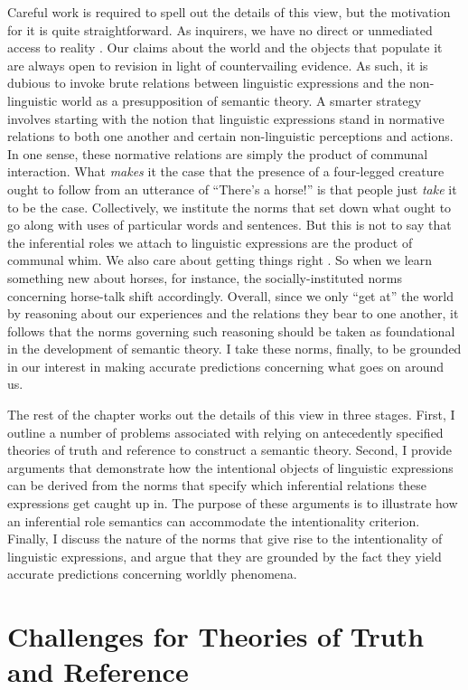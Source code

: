 Careful work is required to spell out the details of this view, but the motivation for it is quite straightforward. As inquirers, we have no direct or unmediated access to reality \citep{Misak:2013}. Our claims about the world and the objects that populate it are always open to revision in light of countervailing evidence. As such, it is dubious to invoke brute relations between linguistic expressions and the non-linguistic world as a presupposition of semantic theory. A smarter strategy involves starting with the notion that linguistic expressions stand in normative relations to both one another and certain non-linguistic perceptions and actions. In one sense, these normative relations are simply the product of communal interaction. What \textit{makes} it the case that the presence of a four-legged creature ought to follow from an utterance of  ``There's a horse!'' is that people just \textit{take} it to be the case. Collectively, we institute the norms that set down what ought to go along with uses of particular words and sentences. But this is not to say that the inferential roles we attach to linguistic expressions are the product of communal whim. We also care about getting things right \citep{Misak:2013}. So when we learn something new about horses, for instance, the socially-instituted norms concerning horse-talk shift accordingly. Overall, since we only ``get at'' the world by reasoning about our experiences and the relations they bear to one another, it follows that the norms governing such reasoning should be taken as foundational in the development of semantic theory. I take these norms, finally, to be grounded in our interest in making accurate predictions concerning what goes on around us. 

The rest of the chapter works out the details of this view in three stages. First, I outline a number of problems associated with relying on antecedently specified theories of truth and reference to construct a semantic theory. Second, I provide arguments that demonstrate how the intentional objects of linguistic expressions can be derived from the norms that specify which inferential relations these expressions get caught up in. The purpose of these arguments is to illustrate how an inferential role semantics can accommodate the intentionality criterion. Finally, I discuss the nature of the norms that give rise to the intentionality of linguistic expressions, and argue that they are grounded by the fact they yield accurate predictions concerning worldly phenomena. 

\section{Challenges for Theories of Truth and Reference}

